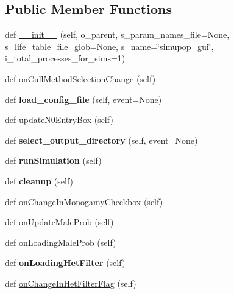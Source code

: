\subsection*{Public Member Functions}
\begin{DoxyCompactItemize}
\item 
def \hyperlink{classnegui_1_1pgguisimupop_1_1PGGuiSimuPop_a17a415eeaa94eab7b7f54724293b34aa}{\+\_\+\+\_\+init\+\_\+\+\_\+} (self, o\+\_\+parent, s\+\_\+param\+\_\+names\+\_\+file=None, s\+\_\+life\+\_\+table\+\_\+file\+\_\+glob=None, s\+\_\+name=\char`\"{}simupop\+\_\+gui\char`\"{}, i\+\_\+total\+\_\+processes\+\_\+for\+\_\+sims=1)
\item 
def \hyperlink{classnegui_1_1pgguisimupop_1_1PGGuiSimuPop_ad1d590f23bbaf0eda730d488ea74c1ba}{on\+Cull\+Method\+Selection\+Change} (self)
\item 
def {\bfseries load\+\_\+config\+\_\+file} (self, event=None)\hypertarget{classnegui_1_1pgguisimupop_1_1PGGuiSimuPop_a9ae755614518ece6584d83aff129f4d5}{}\label{classnegui_1_1pgguisimupop_1_1PGGuiSimuPop_a9ae755614518ece6584d83aff129f4d5}

\item 
def \hyperlink{classnegui_1_1pgguisimupop_1_1PGGuiSimuPop_ac193cf44f5e4f1e5b146a43e9563d7b0}{update\+N0\+Entry\+Box} (self)
\item 
def {\bfseries select\+\_\+output\+\_\+directory} (self, event=None)\hypertarget{classnegui_1_1pgguisimupop_1_1PGGuiSimuPop_a4d88e502ff12249698177dbb4336715d}{}\label{classnegui_1_1pgguisimupop_1_1PGGuiSimuPop_a4d88e502ff12249698177dbb4336715d}

\item 
def {\bfseries run\+Simulation} (self)\hypertarget{classnegui_1_1pgguisimupop_1_1PGGuiSimuPop_a7dc99019295f2a2650fa95ecddd55239}{}\label{classnegui_1_1pgguisimupop_1_1PGGuiSimuPop_a7dc99019295f2a2650fa95ecddd55239}

\item 
def {\bfseries cleanup} (self)\hypertarget{classnegui_1_1pgguisimupop_1_1PGGuiSimuPop_a24642a8bffa19a61a4fb1b6d5e9f0a1c}{}\label{classnegui_1_1pgguisimupop_1_1PGGuiSimuPop_a24642a8bffa19a61a4fb1b6d5e9f0a1c}

\item 
def \hyperlink{classnegui_1_1pgguisimupop_1_1PGGuiSimuPop_a39516af31f4a2a78109a50c3ac0600b1}{on\+Change\+In\+Monogamy\+Checkbox} (self)
\item 
def \hyperlink{classnegui_1_1pgguisimupop_1_1PGGuiSimuPop_af60147f243d0a6a817a5118b9f8b6fe9}{on\+Update\+Male\+Prob} (self)
\item 
def \hyperlink{classnegui_1_1pgguisimupop_1_1PGGuiSimuPop_a52fb256d5fe445bca8e25bc800de033a}{on\+Loading\+Male\+Prob} (self)
\item 
def {\bfseries on\+Loading\+Het\+Filter} (self)\hypertarget{classnegui_1_1pgguisimupop_1_1PGGuiSimuPop_a805f245ad632713035b19d240639d4e4}{}\label{classnegui_1_1pgguisimupop_1_1PGGuiSimuPop_a805f245ad632713035b19d240639d4e4}

\item 
def \hyperlink{classnegui_1_1pgguisimupop_1_1PGGuiSimuPop_a9db4c2db114a83e751c210d01f79b270}{on\+Change\+In\+Het\+Filter\+Flag} (self)
\end{DoxyCompactItemize}
